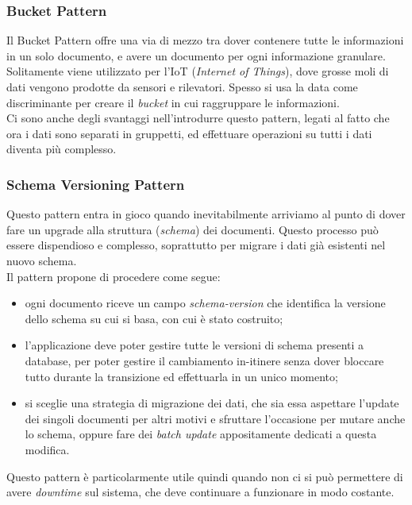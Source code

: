 \subsubsection{Bucket Pattern}
Il Bucket Pattern offre una via di mezzo tra dover contenere tutte le informazioni in un solo documento, e avere un documento per ogni informazione granulare.\\
Solitamente viene utilizzato per l'\gls{IoT} (\textit{Internet of Things}), dove grosse moli di dati vengono prodotte da sensori e rilevatori. Spesso si usa la data come discriminante per creare il \textit{bucket} in cui raggruppare le informazioni.\\
Ci sono anche degli svantaggi nell'introdurre questo pattern, legati al fatto che ora i dati sono separati in gruppetti, ed effettuare operazioni su tutti i dati diventa più complesso.\\

\subsubsection{Schema Versioning Pattern}
Questo pattern entra in gioco quando inevitabilmente arriviamo al punto di dover fare un upgrade alla struttura (\textit{schema}) dei documenti. Questo processo può essere dispendioso e complesso, soprattutto per migrare i dati già esistenti nel nuovo schema.\\
Il pattern propone di procedere come segue:
\begin{itemize}
    \item ogni documento riceve un campo \textit{schema-version} che identifica la versione dello schema su cui si basa, con cui è stato costruito;
    \item l'applicazione deve poter gestire tutte le versioni di schema presenti a database, per poter gestire il cambiamento in-itinere senza dover bloccare tutto durante la transizione ed effettuarla in un unico momento;
    \item si sceglie una strategia di migrazione dei dati, che sia essa aspettare l'update dei singoli documenti per altri motivi e sfruttare l'occasione per mutare anche lo schema, oppure fare dei \textit{batch update} appositamente dedicati a questa modifica.
\end{itemize}
\noindent Questo pattern è particolarmente utile quindi quando non ci si può permettere di avere \textit{downtime} sul sistema, che deve continuare a funzionare in modo costante.\\

